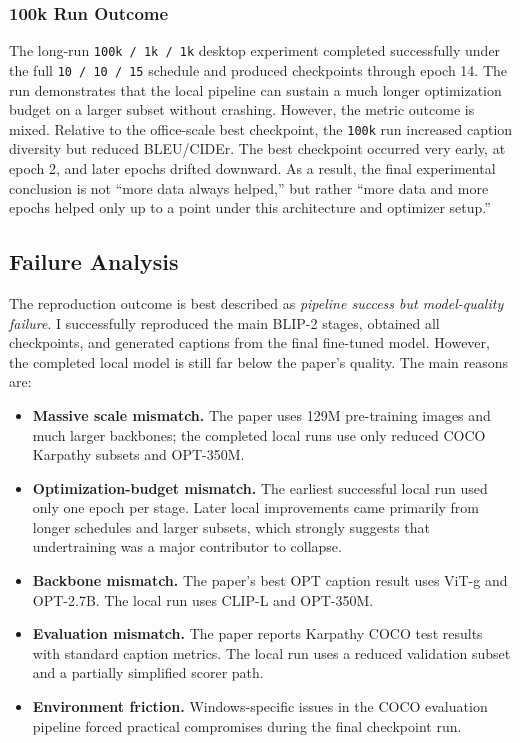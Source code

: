 \documentclass[11pt]{article}
\begin{document}
\subsubsection{100k Run Outcome}
The long-run \texttt{100k / 1k / 1k} desktop experiment completed successfully under the full \texttt{10 / 10 / 15} schedule and produced checkpoints through epoch 14. The run demonstrates that the local pipeline can sustain a much longer optimization budget on a larger subset without crashing. However, the metric outcome is mixed. Relative to the office-scale best checkpoint, the \texttt{100k} run increased caption diversity but reduced BLEU/CIDEr. The best checkpoint occurred very early, at epoch 2, and later epochs drifted downward. As a result, the final experimental conclusion is not ``more data always helped,'' but rather ``more data and more epochs helped only up to a point under this architecture and optimizer setup.''

\subsection{Failure Analysis}
The reproduction outcome is best described as \emph{pipeline success but model-quality failure}. I successfully reproduced the main BLIP-2 stages, obtained all checkpoints, and generated captions from the final fine-tuned model. However, the completed local model is still far below the paper's quality. The main reasons are:

\begin{itemize}
\item \textbf{Massive scale mismatch.} The paper uses 129M pre-training images and much larger backbones; the completed local runs use only reduced COCO Karpathy subsets and OPT-350M.
\item \textbf{Optimization-budget mismatch.} The earliest successful local run used only one epoch per stage. Later local improvements came primarily from longer schedules and larger subsets, which strongly suggests that undertraining was a major contributor to collapse.
\item \textbf{Backbone mismatch.} The paper's best OPT caption result uses ViT-g and OPT-2.7B. The local run uses CLIP-L and OPT-350M.
\item \textbf{Evaluation mismatch.} The paper reports Karpathy COCO test results with standard caption metrics. The local run uses a reduced validation subset and a partially simplified scorer path.
\item \textbf{Environment friction.} Windows-specific issues in the COCO evaluation pipeline forced practical compromises during the final checkpoint run.
\end{itemize}
\end{document}
